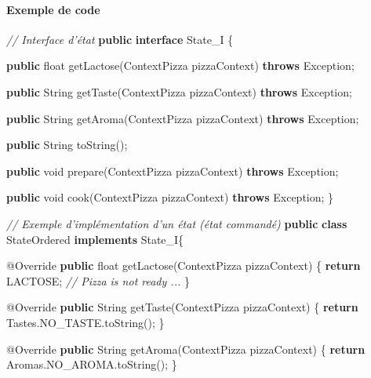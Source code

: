 \documentclass[french,]{article}
\newenvironment{Shaded}{}{}
\newcommand{\KeywordTok}[1]{\textcolor[rgb]{0.00,0.44,0.13}{\textbf{{#1}}}}
\newcommand{\DataTypeTok}[1]{\textcolor[rgb]{0.56,0.13,0.00}{{#1}}}
\newcommand{\CommentTok}[1]{\textcolor[rgb]{0.38,0.63,0.69}{\textit{{#1}}}}
\newcommand{\FunctionTok}[1]{\textcolor[rgb]{0.02,0.16,0.49}{{#1}}}
\newcommand{\NormalTok}[1]{{#1}}
\let\oldparagraph\paragraph
\renewcommand{\paragraph}[1]{\oldparagraph{#1}\mbox{}}
\begin{document}
\paragraph{Exemple de code}\label{exemple-de-code-2}

\begin{Shaded}
\begin{Highlighting}[]
\CommentTok{// Interface d'état}
\KeywordTok{public} \KeywordTok{interface} \NormalTok{State_I \{}

    \KeywordTok{public} \DataTypeTok{float} \FunctionTok{getLactose}\NormalTok{(ContextPizza pizzaContext) }\KeywordTok{throws} \NormalTok{Exception;}

    \KeywordTok{public} \NormalTok{String }\FunctionTok{getTaste}\NormalTok{(ContextPizza pizzaContext) }\KeywordTok{throws} \NormalTok{Exception;}

    \KeywordTok{public} \NormalTok{String }\FunctionTok{getAroma}\NormalTok{(ContextPizza pizzaContext) }\KeywordTok{throws} \NormalTok{Exception;}

    \KeywordTok{public} \NormalTok{String }\FunctionTok{toString}\NormalTok{();}

    \KeywordTok{public} \DataTypeTok{void} \FunctionTok{prepare}\NormalTok{(ContextPizza pizzaContext) }\KeywordTok{throws} \NormalTok{Exception;}

    \KeywordTok{public} \DataTypeTok{void} \FunctionTok{cook}\NormalTok{(ContextPizza pizzaContext) }\KeywordTok{throws} \NormalTok{Exception;}
\NormalTok{\}}

\CommentTok{// Exemple d'implémentation d'un état (état commandé)}
\KeywordTok{public} \KeywordTok{class} \NormalTok{StateOrdered }\KeywordTok{implements} \NormalTok{State_I\{}

    \FunctionTok{@Override}
    \KeywordTok{public} \DataTypeTok{float} \FunctionTok{getLactose}\NormalTok{(ContextPizza pizzaContext) \{}
        \KeywordTok{return} \NormalTok{LACTOSE; }\CommentTok{// Pizza is not ready ...}
    \NormalTok{\}}

    \FunctionTok{@Override}
    \KeywordTok{public} \NormalTok{String }\FunctionTok{getTaste}\NormalTok{(ContextPizza pizzaContext) \{}
        \KeywordTok{return} \NormalTok{Tastes.}\FunctionTok{NO_TASTE}\NormalTok{.}\FunctionTok{toString}\NormalTok{();}
    \NormalTok{\}}

    \FunctionTok{@Override}
    \KeywordTok{public} \NormalTok{String }\FunctionTok{getAroma}\NormalTok{(ContextPizza pizzaContext) \{}
        \KeywordTok{return} \NormalTok{Aromas.}\FunctionTok{NO_AROMA}\NormalTok{.}\FunctionTok{toString}\NormalTok{();}
    \NormalTok{\}}


\end{Highlighting}
\end{Shaded}
\end{document}
